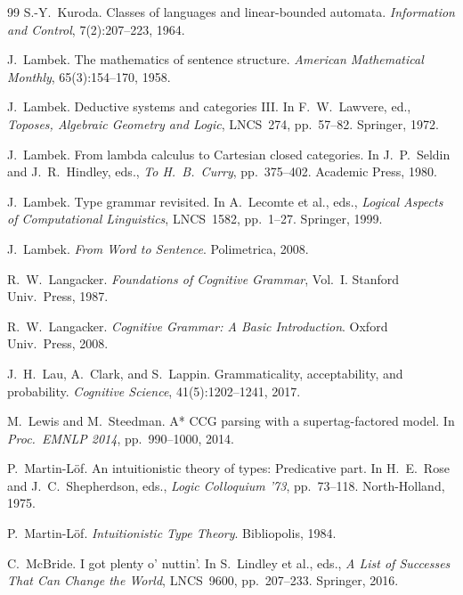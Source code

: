 \documentclass[12pt,a4paper]{article}
\begin{document}
\begin{thebibliography}{99}
S.-Y.~Kuroda.
\newblock Classes of languages and linear-bounded automata.
\newblock \emph{Information and Control}, 7(2):207--223, 1964.

J.~Lambek.
\newblock The mathematics of sentence structure.
\newblock \emph{American Mathematical Monthly}, 65(3):154--170, 1958.

J.~Lambek.
\newblock Deductive systems and categories III.
\newblock In F.~W.~Lawvere, ed., \emph{Toposes, Algebraic Geometry and Logic}, LNCS~274, pp.~57--82. Springer, 1972.

J.~Lambek.
\newblock From lambda calculus to Cartesian closed categories.
\newblock In J.~P.~Seldin and J.~R.~Hindley, eds., \emph{To H.~B.~Curry}, pp.~375--402. Academic Press, 1980.

J.~Lambek.
\newblock Type grammar revisited.
\newblock In A.~Lecomte et al., eds., \emph{Logical Aspects of Computational Linguistics}, LNCS~1582, pp.~1--27. Springer, 1999.

J.~Lambek.
\newblock \emph{From Word to Sentence}.
\newblock Polimetrica, 2008.

R.~W.~Langacker.
\newblock \emph{Foundations of Cognitive Grammar}, Vol.~I.
\newblock Stanford Univ.\ Press, 1987.

R.~W.~Langacker.
\newblock \emph{Cognitive Grammar: A Basic Introduction}.
\newblock Oxford Univ.\ Press, 2008.

J.~H.~Lau, A.~Clark, and S.~Lappin.
\newblock Grammaticality, acceptability, and probability.
\newblock \emph{Cognitive Science}, 41(5):1202--1241, 2017.

M.~Lewis and M.~Steedman.
\newblock A* CCG parsing with a supertag-factored model.
\newblock In \emph{Proc.\ EMNLP 2014}, pp.~990--1000, 2014.

P.~Martin-L\"{o}f.
\newblock An intuitionistic theory of types: Predicative part.
\newblock In H.~E.~Rose and J.~C.~Shepherdson, eds., \emph{Logic Colloquium '73}, pp.~73--118. North-Holland, 1975.

P.~Martin-L\"{o}f.
\newblock \emph{Intuitionistic Type Theory}.
\newblock Bibliopolis, 1984.

C.~McBride.
\newblock I got plenty o' nuttin'.
\newblock In S.~Lindley et al., eds., \emph{A List of Successes That Can Change the World}, LNCS~9600, pp.~207--233. Springer, 2016.


\end{thebibliography}
\end{document}
